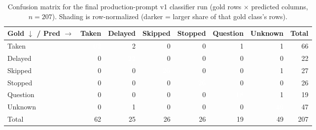 \begin{table}[htbp]
  \centering
  \small
  \caption{Confusion matrix for the final production-prompt v1 classifier run (gold rows $\times$ predicted columns, $n=207$). Shading is row-normalized (darker = larger share of that gold class's rows).}
  \label{tab:confusion-matrix}
  \begin{tabular}{lrrrrrrr}
    \toprule
    Gold $\downarrow$ / Pred $\rightarrow$ & Taken & Delayed & Skipped & Stopped & Question & Unknown & Total \\
    \midrule
    Taken & \cellcolor{medTeal!94}\textcolor{white}{\textbf{62}} & \cellcolor{medTeal!3}2 & \textcolor{medMuted!60}{0} & \textcolor{medMuted!60}{0} & \cellcolor{medTeal!2}1 & \cellcolor{medTeal!2}1 & 66 \\
    Delayed & \textcolor{medMuted!60}{0} & \cellcolor{medTeal!100}\textcolor{white}{\textbf{22}} & \textcolor{medMuted!60}{0} & \textcolor{medMuted!60}{0} & \textcolor{medMuted!60}{0} & \textcolor{medMuted!60}{0} & 22 \\
    Skipped & \textcolor{medMuted!60}{0} & \textcolor{medMuted!60}{0} & \cellcolor{medTeal!96}\textcolor{white}{\textbf{26}} & \textcolor{medMuted!60}{0} & \textcolor{medMuted!60}{0} & \cellcolor{medTeal!4}1 & 27 \\
    Stopped & \textcolor{medMuted!60}{0} & \textcolor{medMuted!60}{0} & \textcolor{medMuted!60}{0} & \cellcolor{medTeal!100}\textcolor{white}{\textbf{26}} & \textcolor{medMuted!60}{0} & \textcolor{medMuted!60}{0} & 26 \\
    Question & \textcolor{medMuted!60}{0} & \textcolor{medMuted!60}{0} & \textcolor{medMuted!60}{0} & \textcolor{medMuted!60}{0} & \cellcolor{medTeal!95}\textcolor{white}{\textbf{18}} & \cellcolor{medTeal!5}1 & 19 \\
    Unknown & \textcolor{medMuted!60}{0} & \cellcolor{medTeal!2}1 & \textcolor{medMuted!60}{0} & \textcolor{medMuted!60}{0} & \textcolor{medMuted!60}{0} & \cellcolor{medTeal!98}\textcolor{white}{\textbf{46}} & 47 \\
    \midrule
    Total & 62 & 25 & 26 & 26 & 19 & 49 & 207 \\
    \bottomrule
  \end{tabular}
\end{table}
